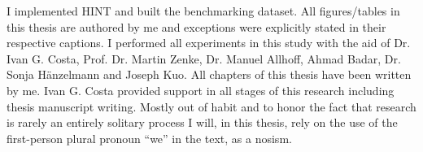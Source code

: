 I implemented HINT and built the benchmarking dataset. All figures/tables in this thesis are authored by me and exceptions were explicitly stated in their respective captions. I performed all experiments in this study with the aid of Dr. Ivan G. Costa, Prof. Dr. Martin Zenke, Dr. Manuel Allhoff, Ahmad Badar, Dr. Sonja H\"{a}nzelmann and Joseph Kuo. All chapters of this thesis have been written by me. Ivan G. Costa provided support in all stages of this research including thesis manuscript writing. Mostly out of habit and to honor the fact that research is rarely an entirely solitary process I will, in this thesis, rely on the use of the first-person plural pronoun ``we'' in the text, as a nosism.


